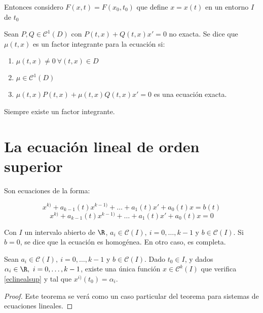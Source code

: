 Entonces considero  $F(x,t) = F(x_0, t_0)$ que define $x=x(t)$ en un entorno $I$ de $t_0$


\begin{ndef}
Sean $P,Q \in \mathscr{C}^1 (D)$ con $P(t,x) + Q(t,x) x' = 0$ no exacta. Se dice que $\mu (t,x)$ es un factor integrante para la ecuación si:
\begin{enumerate}
\item $\mu(t,x) \neq 0 \ \forall (t,x) \in D$
\item $\mu \in \mathscr{C}^1 (D)$
\item $\mu (t,x)P(t,x) + \mu (t,x)Q(t,x) x' = 0$ es una ecuación exacta.
\end{enumerate}

\begin{nota}
  Siempre existe un factor integrante.
\end{nota}

\end{ndef}

\newpage

\section{La ecuación lineal de orden superior}

Son ecuaciones de la forma: 

\begin{equation}
  x^{k)} + a_{k-1}(t)x^{k-1)} + \dots + a_1(t)x' + a_0(t)x = b(t) \tag{L} \label{eclinealsup}
\end{equation}
\begin{equation}
  x^{k)} + a_{k-1}(t)x^{k-1)} + \dots + a_1(t)x' + a_0(t)x = 0 \tag{H} \label{eclinhom}
\end{equation}

Con $I$ un intervalo abierto de $\R$, $a_i \in \mathscr{C}(I), \ i=0,\dots,k-1$ y $b\in \mathscr{C}(I)$.
Si $b = 0$, se dice que la ecuación es homogénea. En otro caso, es completa.

\begin{nth} \label{unicidadeclinsup}
  Sean $a_i \in \mathscr{C}(I), \ i=0,\dots,k-1$ y $b\in \mathscr{C}(I)$. Dado $t_0\in I$, y dados $\alpha_i\in\R, \ i=0,\dots,k-1$,
  existe una única función $x\in\mathscr{C}^k(I)$ que verifica \eqref{eclinealsup} y tal que $x^{i)}(t_0) = \alpha_i$.
\end{nth}

\begin{proof}
  Este teorema se verá como un caso particular del teorema para sistemas de ecuaciones lineales.
\end{proof}

